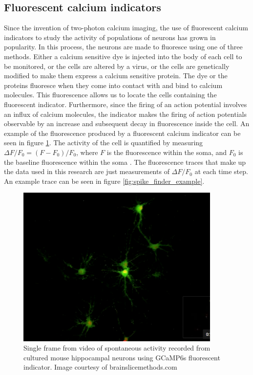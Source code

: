 \documentclass[a4paper,12pt]{article}
\theoremstyle{definition}
\begin{document}
\subsection{Fluorescent calcium indicators}
Since the invention of two-photon calcium imaging, the use of fluorescent calcium indicators to study the activity of populations of neurons has grown in popularity. In this process, the neurons are made to fluoresce using one of three methods. Either a calcium sensitive dye is injected into the body of each cell to be monitored, or the cells are altered by a virus, or the cells are genetically modified to make them express a calcium sensitive protein. The dye or the proteins fluoresce when they come into contact with and bind to calcium molecules. This fluorescence allows us to locate the cells containing the fluorescent indicator. Furthermore, since the firing of an action potential involves an influx of calcium molecules, the indicator makes the firing of action potentials observable by an increase and subsequent decay in fluorescence inside the cell. An example of the fluorescence produced by a fluorescent calcium indicator can be seen in figure \ref{fig:GCaMP6_fluorescence}. The activity of the cell is quantified by measuring $\Delta F/F_0 = (F - F_0)/F_0$, where $F$ is the fluorescence within the soma, and $F_0$ is the baseline fluorescence within the soma \cite{maravall}. The fluorescence traces that make up the data used in this research are just measurements of $\Delta F/F_0$ at each time step. An example trace can be seen in figure \ref{fig:spike_finder_example}.

\begin{figure}[ht]
  \centering
  \includegraphics[width=0.9\textwidth]{figures/GCaMP6_fluorescence.png}
  \caption{Single frame from video of spontaneous activity recorded from cultured mouse hippocampal neurons using GCaMP6s fluorescent indicator. Image courtesy of brainslicemethods.com}
  \label{fig:GCaMP6_fluorescence}
\end{figure}
\end{document}
